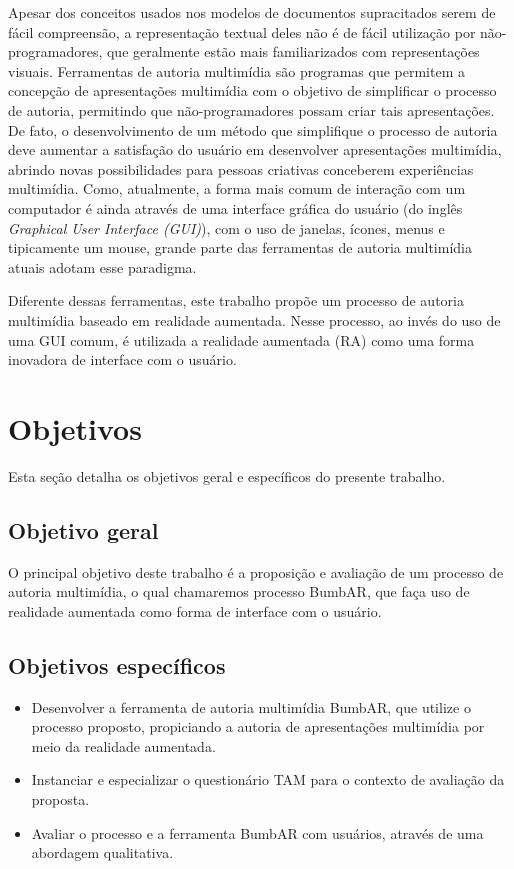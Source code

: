 \documentclass[../main.tex]{subfiles}
\begin{document}
Apesar dos conceitos usados nos modelos de documentos supracitados serem de fácil compreensão, a representação textual deles não é de fácil utilização por não-programadores, que geralmente estão mais familiarizados com representações visuais. Ferramentas de autoria multimídia são programas que permitem a concepção de apresentações multimídia com o objetivo de simplificar o processo de autoria, permitindo que não-programadores possam criar tais apresentações. De fato, o desenvolvimento de um método que simplifique o processo de autoria deve aumentar a satisfação do usuário em desenvolver apresentações multimídia, abrindo novas possibilidades para pessoas criativas conceberem experiências multimídia. Como, atualmente, a forma mais comum de interação com um computador é ainda através de uma interface gráfica do usuário (do inglês \emph{Graphical User Interface (GUI)}), com o uso de janelas, ícones, menus e tipicamente um mouse, grande parte das ferramentas de autoria multimídia atuais adotam esse paradigma.

Diferente dessas ferramentas, este trabalho propõe um processo de autoria multimídia baseado em realidade aumentada. Nesse processo, ao invés do uso de uma GUI comum, é utilizada a realidade aumentada (RA) como uma forma inovadora de interface com o usuário.  

\section{Objetivos}
    Esta seção detalha os objetivos geral e específicos do presente trabalho.
\subsection{Objetivo geral}
    O principal objetivo deste trabalho é a proposição e avaliação de um processo de autoria multimídia, o qual chamaremos processo BumbAR, que faça uso de realidade aumentada como forma de interface com o usuário.
    
\subsection{Objetivos específicos}

\begin{itemize}
    \item Desenvolver a ferramenta de autoria multimídia BumbAR, que utilize o processo proposto, propiciando a autoria de apresentações multimídia por meio da realidade aumentada.
    
	\item Instanciar e especializar o questionário TAM para o contexto de avaliação da proposta.    
  
    \item Avaliar o processo e a ferramenta BumbAR com usuários, através de uma abordagem qualitativa.
    
\end{itemize}
\end{document}
